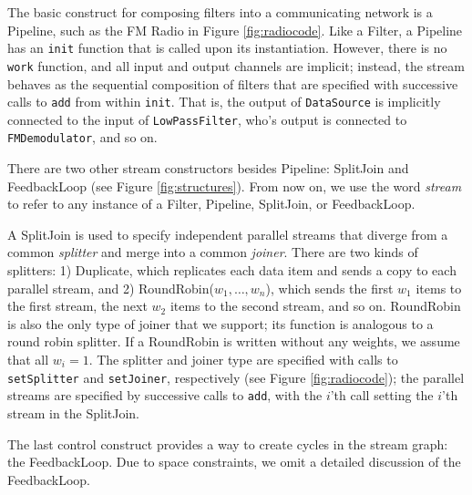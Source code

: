 

The basic construct for composing filters into a communicating network
is a Pipeline, such as the FM Radio in Figure \ref{fig:radiocode}.
Like a Filter, a Pipeline has an {\tt init} function that is called
upon its instantiation.  However, there is no {\tt work} function, and
all input and output channels are implicit; instead, the stream
behaves as the sequential composition of filters that are specified
with successive calls to {\tt add} from within {\tt init}.  That is,
the output of {\tt DataSource} is implicitly connected to the input of
{\tt LowPassFilter}, who's output is connected to {\tt FMDemodulator},
and so on.

There are two other stream constructors besides Pipeline: SplitJoin
and FeedbackLoop (see Figure \ref{fig:structures}).  From now on, we
use the word {\it stream} to refer to any instance of a Filter,
Pipeline, SplitJoin, or FeedbackLoop.

A SplitJoin is used to specify independent parallel streams that
diverge from a common {\it splitter} and merge into a common {\it
joiner}.  There are two kinds of splitters: 1) Duplicate, which
replicates each data item and sends a copy to each parallel stream,
and 2) RoundRobin($w_1, \dots, w_n$), which sends the first $w_1$
items to the first stream, the next $w_2$ items to the second stream,
and so on.  RoundRobin is also the only type of joiner that we
support; its function is analogous to a round robin splitter.  If a
RoundRobin is written without any weights, we assume that all $w_i =
1$.  The splitter and joiner type are specified with calls to {\tt
setSplitter} and {\tt setJoiner}, respectively (see Figure
\ref{fig:radiocode}); the parallel streams are specified by successive
calls to {\tt add}, with the $i$'th call setting the $i$'th stream in
the SplitJoin.

The last control construct provides a way to create cycles in the
stream graph: the FeedbackLoop.  Due to space constraints, we omit a
detailed discussion of the FeedbackLoop.


